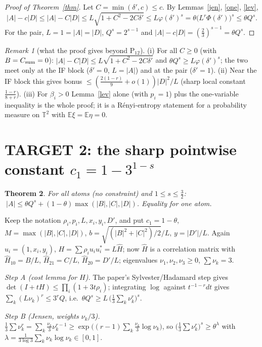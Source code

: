 \documentclass[11pt]{article}
\newtheorem{theorem}{Theorem}\newtheorem{lemma}[theorem]{Lemma}\newtheorem{corollary}[theorem]{Corollary}
\theoremstyle{remark}\newtheorem{remark}[theorem]{Remark}
\newcommand{\T}{\mathbb T}
\begin{document}
\begin{proof}[Proof of Theorem~\ref{thm}]
Let $C=\min(\delta',c)\le c$.  By Lemmas~\ref{jen}, \ref{one}, \ref{lev},
\[|A|-c|D|\le|A|-C|D|\le L\sqrt{1+C^2-2C\delta'}\le L\varphi(\delta')^s=\theta\big(L^r\Phi(\delta')\big)^s\le\theta Q^s.\]
For the pair, $L=1=|A|=|D|$, $Q^s=2^{s-1}$ and $|A|-c|D|=(\frac23)^{s-1}=\theta Q^s$.
\end{proof}

\begin{remark}[what the proof gives beyond P$_{12}$]
(i) For all $C\ge0$ (with $B=C_{\rm sum}=0$): $|A|-C|D|\le L\sqrt{1+C^2-2C\delta'}$ and $\theta Q^s\ge L\varphi(\delta')^s$; the two meet only at the
IF block ($\delta'=0$, $L=|A|$) and at the pair ($\delta'=1$).  (ii) Near the IF block this gives bonus $\le(\frac{2(1-r)}9+o(1))|D|^2/L$
(sharp local constant $\frac{1-r}{8+r}$).  (iii) For $\beta_i>0$ Lemma~\ref{lev} alone (with $p_i=1$) plus the one-variable inequality is the
whole proof; it is a R\'enyi-entropy statement for a probability measure on $\T^2$ with $\mathbb E\xi=\mathbb E\eta=0$.
\end{remark}

\section*{TARGET 2: the sharp pointwise constant $c_1=1-3^{1-s}$}
\begin{theorem}\label{thm2}
For all atoms (no constraint) and $1\le s\le\frac32$: $\ |A|\le\theta Q^s+(1-\theta)\max(|B|,|C|,|D|)$.  Equality for one atom.
\end{theorem}
Keep the notation $\rho_i,p_i,L,x_i,y_i,D'$, and put $c_1=1-\theta$, $M=\max(|B|,|C|,|D|)$, $b=\sqrt{(|B|^2+|C|^2)/2}/L$, $y=|D'|/L$.
Again $u_i=(1,x_i,y_i)$, $H=\sum\rho_iu_iu_i^*=L\hat H$; now $\hat H$ is a correlation matrix with
$\hat H_{10}=B/L$, $\hat H_{21}=C/L$, $\hat H_{20}=D'/L$; eigenvalues $\nu_1,\nu_2,\nu_3\ge0$, $\sum\nu_k=3$.

\emph{Step A (cost lemma for $H$).}  The paper's Sylvester/Hadamard step gives $\det(I+tH)\le\prod_i(1+3t\rho_i)$; integrating $\log$ against
$t^{-1-r}dt$ gives $\sum_k(L\nu_k)^r\le3^rQ$, i.e.\ $\theta Q^s\ge L\,\big(\frac13\sum_k\nu_k^r\big)^s$.

\emph{Step B (Jensen, weights $\nu_k/3$).}  $\frac13\sum\nu_k^r=\sum_k\frac{\nu_k}3\nu_k^{r-1}\ge\exp\big((r-1)\sum_k\frac{\nu_k}3\log\nu_k\big)$, so
$\big(\frac13\sum\nu_k^r\big)^s\ge\theta^{\lambda}$ with $\lambda=\frac1{3\log3}\sum_k\nu_k\log\nu_k\in[0,1]$.
\end{document}
